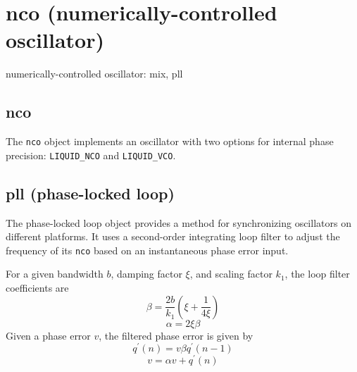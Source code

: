 % 
%

\section{nco (numerically-controlled oscillator)}
\label{module:nco}
numerically-controlled oscillator: mix, pll

\subsection{{nco}}
\label{module:nco:nco}
The {\tt nco} object implements an oscillator with two options for internal
phase precision: {\tt LIQUID\_NCO} and {\tt LIQUID\_VCO}.

\subsection{{pll} (phase-locked loop)}
\label{module:nco:pll}
The phase-locked loop object provides a method for synchronizing oscillators
on different platforms.
It uses a second-order integrating loop filter to adjust the frequency of its
{\tt nco} based on an instantaneous phase error input.

For a given bandwidth $b$, damping factor $\xi$, and scaling factor $k_1$,
the loop filter coefficients are
\[  \beta = \frac{2b}{k_1} \left(\xi + \frac{1}{4\xi} \right)   \]
\[  \alpha = 2 \xi \beta    \]
Given a phase error $v$, the filtered phase error is given by
\[  q^\prime(n) = v \beta q^\prime(n-1) \]
\[  v = \alpha v + q^\prime(n)          \]

